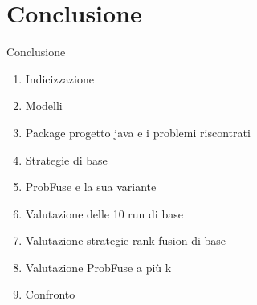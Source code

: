 \section{Conclusione}
\begin{frame}{Conclusione}
	\begin{enumerate}
		\setlength\itemsep{0.6em}
		\item Indicizzazione
		\item Modelli
		\item Package progetto java e i problemi riscontrati
		\item Strategie di base 
		\item ProbFuse e la sua variante
		\item Valutazione delle 10 run di base
		\item Valutazione strategie rank fusion di base
		\item Valutazione ProbFuse a più k
		\item Confronto
	\end{enumerate}
\end{frame}


